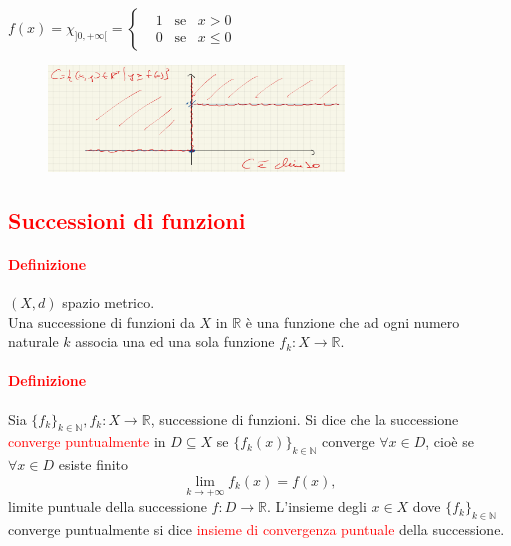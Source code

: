 \documentclass{article}
\newcommand{\R}{\mathbb{R}}
\newcommand{\N}{\mathbb{N}}
\begin{document}
\begin{enumerate}
    $f(x)=\chi_{]0,+\infty[}=\begin{cases}
        &1 \,\,\,\,\,\text{se}\,\,\,\,\, x > 0\\
        &0\,\,\,\,\, \text{se}\,\,\,\,\, x \leq 0
    \end{cases}$
    \begin{figure}[!h]
        \centering
        \includegraphics[width=0.7\textwidth]{Screenshot from 2023-03-28 22-17-48.png}
    \end{figure}
\end{enumerate}

\subsection{\textcolor{red}{Successioni di funzioni}}
\paragraph{\textcolor{red}{Definizione}}
$(X,d)$ spazio metrico.\\
Una successione di funzioni da $X$ in $\R$ è una funzione che ad ogni numero naturale $k$ associa una ed una sola funzione $f_k:X\rightarrow \R$. 

\paragraph{\textcolor{red}{Definizione}}
Sia $\{ f_k \}_{k\in\N}, f_k:X \rightarrow \R$, successione di funzioni. Si dice che la successione \textcolor{red}{converge puntualmente} in $D \subseteq X$ se $\{f_k(x)\}_{k\in\N}$ converge $\forall x \in D$, cioè se $\forall x \in D$ esiste finito
\begin{equation*}
    \lim_{k\rightarrow +\infty} f_k(x)=f(x),
\end{equation*}
limite puntuale della successione $f : D \rightarrow \R$. L'insieme degli $x \in X$ dove $\{f_k \}_{k \in \N}$ converge puntualmente si dice \textcolor{red}{insieme di convergenza puntuale} della successione.
\end{document}
